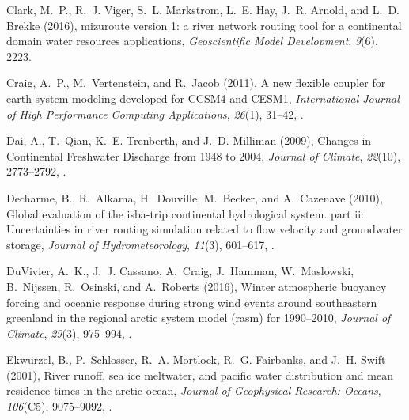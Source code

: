 \documentclass[jgrga, draft]{agutex}
\begin{document}
\begin{article}
\begin{thebibliography}{79}
Clark, M.~P., R.~J. Viger, S.~L. Markstrom, L.~E. Hay, J.~R. Arnold, and L.~D.
  Brekke (2016), mizuroute version 1: a river network routing tool for a
  continental domain water resources applications, \textit{Geoscientific Model
  Development}, \textit{9}(6), 2223.

Craig, A.~P., M.~Vertenstein, and R.~Jacob (2011), {A new flexible coupler for
  earth system modeling developed for {CCSM}4 and {CESM}1},
  \textit{International Journal of High Performance Computing Applications},
  \textit{26}(1), 31--42, .

Dai, A., T.~Qian, K.~E. Trenberth, and J.~D. Milliman (2009), {Changes in
  Continental Freshwater Discharge from 1948 to 2004}, \textit{Journal of
  Climate}, \textit{22}(10), 2773--2792, .

Decharme, B., R.~Alkama, H.~Douville, M.~Becker, and A.~Cazenave (2010), Global
  evaluation of the isba-trip continental hydrological system. part ii:
  Uncertainties in river routing simulation related to flow velocity and
  groundwater storage, \textit{Journal of Hydrometeorology}, \textit{11}(3),
  601--617, .

DuVivier, A.~K., J.~J. Cassano, A.~Craig, J.~Hamman, W.~Maslowski, B.~Nijssen,
  R.~Osinski, and A.~Roberts (2016), Winter atmospheric buoyancy forcing and
  oceanic response during strong wind events around southeastern greenland in
  the regional arctic system model (rasm) for 1990–2010, \textit{Journal of
  Climate}, \textit{29}(3), 975--994, .

Ekwurzel, B., P.~Schlosser, R.~A. Mortlock, R.~G. Fairbanks, and J.~H. Swift
  (2001), River runoff, sea ice meltwater, and pacific water distribution and
  mean residence times in the arctic ocean, \textit{Journal of Geophysical
  Research: Oceans}, \textit{106}(C5), 9075--9092, .


\end{thebibliography}
\end{article}
\end{document}
